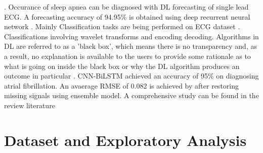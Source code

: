 \documentclass[a4paper, fleqn]{cas-sc}
\begin{document}
\cite{xu2018raim}. Occurance of sleep apnea can be diagnosed with DL forecasting of single lead ECG. A forecasting accuracy of 94.95\% is obtained using deep recurrent neural network \cite{bahrami2022deep}. Mainly Classification tasks are being performed on ECG dataset \cite{strodthoff2020deep}. Classifications involving wavelet transforms and encoding decoding\cite{mewada20232d}. Algorithms in DL are referred to as a 'black box',  which means there is no transparency and,  as a result,  no explanation is available to the users to provide some rationale as to what is going on inside the black box or why the DL algorithm produces an outcome in particular \cite{von2021transparency}. CNN-BiLSTM achieved an accuracy of 95\% on diagnosing atrial fibrillation\cite{aldughayfiq2023deep}. An avaerage RMSE of 0.082 is achieved by \cite{yoo2023restoration} after restoring missing signals using ensemble model. A comprehensive study can be found in the review literature \cite{musa2023systematic}


\section{Dataset and Exploratory Analysis}
 
\end{document}
